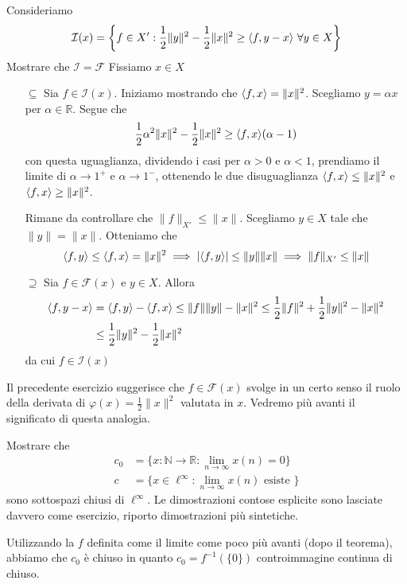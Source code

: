\begin{eser}{}
    Consideriamo
    \[
      \mathcal{I}{(x)} = \left\{f \in X' : \frac{1}{2}\|y\|^2 - \frac{1}{2}\|x\|^2 \ge {\left\langle f, y-x\right\rangle} \,\, \forall y \in X \right\} 
    \]
    Mostrare che \(\mathcal{I} = \mathcal{F}\) 
    \tcblower
    Fissiamo \(x \in X\) 
    \begin{itemize}
        \item[\(\subseteq \)] Sia \(f \in \mathcal{I}{(x)}\). Iniziamo mostrando
            che \({\left\langle f, x\right\rangle} = \|x\|^2\). Scegliamo \(y = \alpha x \) per \(\alpha \in \mathbb{R}\). Segue che
            \[
              \frac{1}{2}\alpha^2 \|x\|^2 - \frac{1}{2}\|x\|^2 \ge {\left\langle f, x\right\rangle}
              {(\alpha - 1)}
            \]
            con questa uguaglianza, dividendo i casi per \(
            \alpha > 0 \) e \(\alpha < 1\), prendiamo il limite di \(\alpha \to 1^{+}\) e \(\alpha \to 1^{-}\), ottenendo le due disuguaglianza \({\left\langle f, x\right\rangle} \le \|x\|^2\) e \({\left\langle f, x\right\rangle} \ge \|x\|^2\).

            Rimane da controllare che \(\|f\|_{X'} \le \|x\|\). Scegliamo \(y \in X\) tale che \(\|y\| = \|x\|\). Otteniamo che
            \[
              {\left\langle f, y\right\rangle}  \le  {\left\langle f, x\right\rangle}  = \|x\|^2 \implies |{\left\langle f, y\right\rangle}| \le
              \|y\|\|x\| \implies \|f\|_{X'} \le \|x\|
            \]
        \item[\(\supseteq \)] Sia \(f \in \mathcal{F}{(x)}\) e \(y \in X\). Allora 
            \begin{align*}
                {\left\langle f, y - x\right\rangle} &= {\left\langle f, y\right\rangle}  - {\left\langle f, x\right\rangle} \le \|f\|\|y\| - \|x\|^2 \le \frac{1}{2} \|f\|^2 + \frac{1}{2}\|y\| ^2 - \|x\|^2 \\ &\le  \frac{1}{2}\|y\|^2 - \frac{1}{2}\|x\|^2
            \end{align*}
            da cui \(f \in \mathcal{I}{(x)}\) 
    \end{itemize}
\end{eser}
\begin{remark}{}
    Il precedente esercizio suggerisce che \(f \in \mathcal{F}{(x)}\) svolge in
    un certo senso il ruolo della derivata di \(\varphi {(x)} = \frac{1}{2}\|x\|^2\)  valutata in \(x\). Vedremo più avanti il significato di questa analogia.
\end{remark}
\begin{eser}
    Mostrare che
    \begin{align*}
        c_{0} &= \{x : \mathbb{N} \to \mathbb{R} : \lim_{n \to \infty} x{(n)} = 0\} \\ 
        c &= \{x \in \ell^{\infty} : \lim_{n \to \infty} x{(n)} \text{ esiste }\} 
    \end{align*}
    sono sottospazi chiusi di \(\ell^{\infty}\).
    \tcblower
    Le dimostrazioni contose esplicite sono lasciate davvero come esercizio,
    riporto dimostrazioni più sintetiche.

    Utilizzando la \(f\) definita come il limite come poco più avanti (dopo il
    teorema), abbiamo che \(c_{0}\) è chiuso in quanto \(c_{0} = f^{-1}{(\{0\} )}\)
    controimmagine continua di chiuso.
\end{eser}


